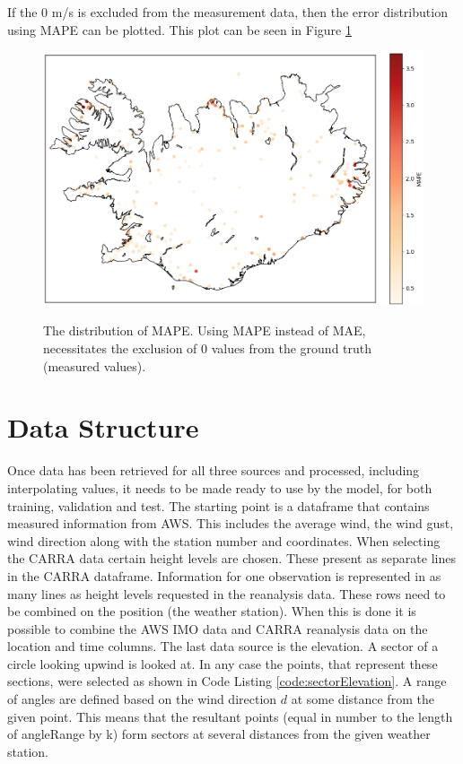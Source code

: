 If the 0 m/s is excluded from the measurement data, then the error distribution using MAPE can be plotted. This plot can be seen in Figure \ref{fig:station_mape_distribution}

\begin{figure}
    \caption[Distribution of MAPE by station]{The distribution of MAPE. Using MAPE instead of MAE, necessitates the exclusion of 0 values from the ground truth (measured values).}
    \includegraphics[scale=0.6]{Figures/MAPEoverIceland.png}
    \label{fig:station_mape_distribution}
\end{figure}

\section{Data Structure}

Once data has been retrieved for all three sources and processed, including interpolating values, it needs to be made ready to use by the model, for both training, validation and test. The starting point is a dataframe that contains measured information from AWS. This includes the average wind, the wind gust, wind direction along with the station number and coordinates. When selecting the CARRA data certain height levels are chosen. These present as separate lines in the CARRA dataframe. Information for one observation is represented in as many lines as height levels requested in the reanalysis data. These rows need to be combined on the position (the weather station). When this is done it is possible to combine the AWS IMO data and CARRA reanalysis data on the location and time columns. The last data source is the elevation. A sector of a circle looking upwind is looked at. In any case the points, that represent these sections, were selected as shown in Code Listing \ref{code:sectorElevation}. A range of angles are defined based on the wind direction $d$ at some distance from the given point. This means that the resultant points (equal in number to the length of angleRange by k) form sectors at several distances from the given weather station.

